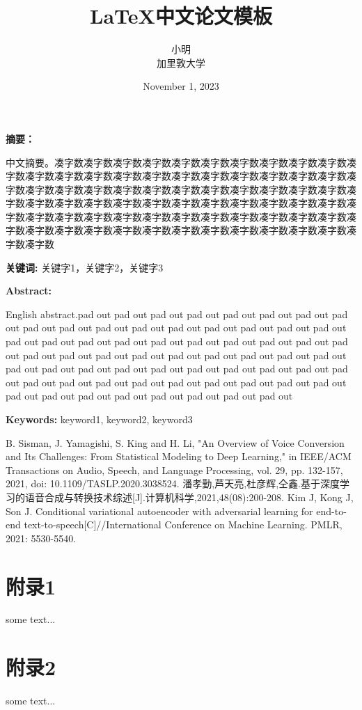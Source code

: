 \documentclass[12pt, a4paper]{ctexart} %
\title{\heiti \zihao{2}\LaTeX 中文论文模板}%
\author{\kaishu \zihao{-4} 小明\\\songti \zihao{-5} 加里敦大学}%
\date{November 1, 2023}
\newenvironment{enabstract}{
  \par \noindent\centerline{\bfseries \LARGE Abstract:} %
  \par \vskip 12pt}{\par\vskip 12pt} %
\newenvironment{cnabstract}{
  \par \noindent\centerline{\bfseries \LARGE 摘要：}
  \par \vskip 12pt}{\par\vskip 12pt}
\numberwithin{equation}{section}%
\numberwithin{figure}{section}%
\begin{document}
\maketitle 
\thispagestyle{empty} %

\setcounter{page}{1} %
\begin{cnabstract}
	中文摘要。凑字数凑字数凑字数凑字数凑字数凑字数凑字数凑字数凑字数凑字数凑字数凑字数凑字数凑字数凑字数凑字数凑字数凑字数凑字数凑字数凑字数凑字数凑字数凑字数凑字数凑字数凑字数凑字数凑字数凑字数凑字数凑字数凑字数凑字数凑字数凑字数凑字数凑字数凑字数凑字数凑字数凑字数凑字数凑字数凑字数凑字数凑字数凑字数凑字数凑字数凑字数凑字数凑字数凑字数凑字数凑字数凑字数凑字数凑字数凑字数凑字数凑字数凑字数凑字数凑字数凑字数凑字数凑字数凑字数凑字数凑字数凑字数
	\par\noindent\textbf{关键词: } 关键字1，关键字2，关键字3 %
\end{cnabstract}
	
	\newpage
\begin{enabstract}
	English abstract.pad out pad out pad out pad out pad out pad out pad out pad out pad out pad out pad out pad out pad out pad out pad out pad out pad out pad out pad out pad out pad out pad out pad out pad out pad out pad out pad out pad out pad out pad out pad out pad out pad out pad out pad out pad out pad out pad out pad out pad out pad out pad out pad out pad out pad out pad out pad out pad out pad out pad out pad out pad out pad out pad out pad out pad out pad out pad out pad out pad out pad out pad out pad out 
	\par\noindent\textbf{Keywords:} keyword1, keyword2, keyword3
\end{enabstract}


\newpage
\tableofcontents

\newpage


\newpage
\begin{thebibliography}{99} %
	B. Sisman, J. Yamagishi, S. King and H. Li, "An Overview of Voice Conversion and Its Challenges: From Statistical Modeling to Deep Learning," in IEEE/ACM Transactions on Audio, Speech, and Language Processing, vol. 29, pp. 132-157, 2021, doi: 10.1109/TASLP.2020.3038524.
	潘孝勤,芦天亮,杜彦辉,仝鑫.基于深度学习的语音合成与转换技术综述[J].计算机科学,2021,48(08):200-208.
	Kim J, Kong J, Son J. Conditional variational autoencoder with adversarial learning for end-to-end text-to-speech[C]//International Conference on Machine Learning. PMLR, 2021: 5530-5540.
\end{thebibliography}

\newpage
\appendix
 \section{附录1}
	some text...
 \section{附录2}
	some text...
\end{document}
